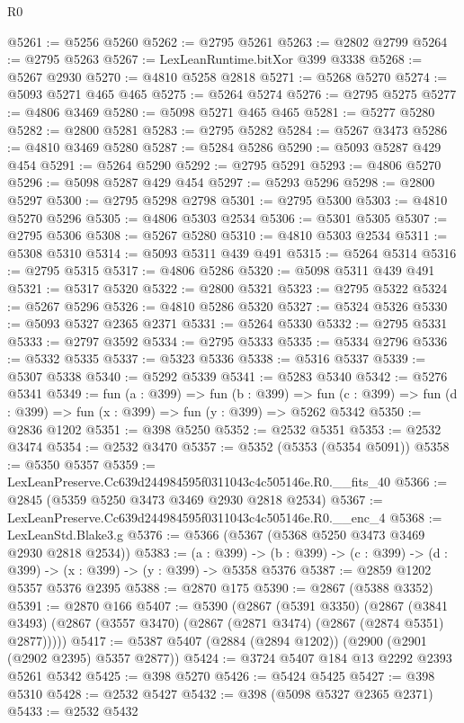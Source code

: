 \begin{lexlean}{R0}
\begin{coremodule}
@5261 := @5256 @5260
@5262 := @2795 @5261
@5263 := @2802 @2799
@5264 := @2795 @5263
@5267 := LexLeanRuntime.bitXor @399 @3338
@5268 := @5267 @2930
@5270 := @4810 @5258 @2818
@5271 := @5268 @5270
@5274 := @5093 @5271 @465 @465
@5275 := @5264 @5274
@5276 := @2795 @5275
@5277 := @4806 @3469
@5280 := @5098 @5271 @465 @465
@5281 := @5277 @5280
@5282 := @2800 @5281
@5283 := @2795 @5282
@5284 := @5267 @3473
@5286 := @4810 @3469 @5280
@5287 := @5284 @5286
@5290 := @5093 @5287 @429 @454
@5291 := @5264 @5290
@5292 := @2795 @5291
@5293 := @4806 @5270
@5296 := @5098 @5287 @429 @454
@5297 := @5293 @5296
@5298 := @2800 @5297
@5300 := @2795 @5298 @2798
@5301 := @2795 @5300
@5303 := @4810 @5270 @5296
@5305 := @4806 @5303 @2534
@5306 := @5301 @5305
@5307 := @2795 @5306
@5308 := @5267 @5280
@5310 := @4810 @5303 @2534
@5311 := @5308 @5310
@5314 := @5093 @5311 @439 @491
@5315 := @5264 @5314
@5316 := @2795 @5315
@5317 := @4806 @5286
@5320 := @5098 @5311 @439 @491
@5321 := @5317 @5320
@5322 := @2800 @5321
@5323 := @2795 @5322
@5324 := @5267 @5296
@5326 := @4810 @5286 @5320
@5327 := @5324 @5326
@5330 := @5093 @5327 @2365 @2371
@5331 := @5264 @5330
@5332 := @2795 @5331
@5333 := @2797 @3592
@5334 := @2795 @5333
@5335 := @5334 @2796
@5336 := @5332 @5335
@5337 := @5323 @5336
@5338 := @5316 @5337
@5339 := @5307 @5338
@5340 := @5292 @5339
@5341 := @5283 @5340
@5342 := @5276 @5341
@5349 := fun (a : @399) =>
  fun (b : @399) =>
  fun (c : @399) => fun (d : @399) => fun (x : @399) => fun (y : @399) => @5262 @5342
@5350 := @2836 @1202
@5351 := @398 @5250
@5352 := @2532 @5351
@5353 := @2532 @3474
@5354 := @2532 @3470
@5357 := @5352 (@5353 (@5354 @5091))
@5358 := @5350 @5357
@5359 := LexLeanPreserve.Cc639d244984595f0311043c4c505146e.R0.__fits_40
@5366 := @2845 (@5359 @5250 @3473 @3469 @2930 @2818 @2534)
@5367 := LexLeanPreserve.Cc639d244984595f0311043c4c505146e.R0.__enc_4
@5368 := LexLeanStd.Blake3.g
@5376 := @5366 (@5367 (@5368 @5250 @3473 @3469 @2930 @2818 @2534))
@5383 := (a : @399) ->
  (b : @399) -> (c : @399) -> (d : @399) -> (x : @399) -> (y : @399) -> @5358 @5376
@5387 := @2859 @1202 @5357 @5376 @2395
@5388 := @2870 @175
@5390 := @2867 (@5388 @3352)
@5391 := @2870 @166
@5407 := @5390
    (@2867
      (@5391 @3350)
      (@2867 (@3841 @3493) (@2867 (@3557 @3470) (@2867 (@2871 @3474) (@2867 (@2874 @5351) @2877)))))
@5417 := @5387 @5407 (@2884 (@2894 @1202)) (@2900 (@2901 (@2902 @2395) @5357 @2877))
@5424 := @3724 @5407 @184 @13 @2292 @2393 @5261 @5342
@5425 := @398 @5270
@5426 := @5424 @5425
@5427 := @398 @5310
@5428 := @2532 @5427
@5432 := @398 (@5098 @5327 @2365 @2371)
@5433 := @2532 @5432

\end{coremodule}
\end{lexlean}
